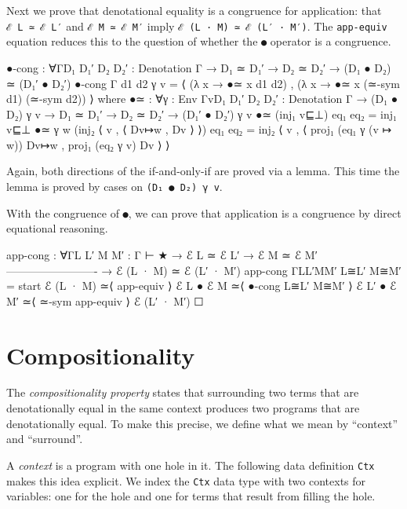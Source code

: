 Next we prove that denotational equality is a congruence for
application: that \texttt{ℰ\ L\ ≃\ ℰ\ L′} and \texttt{ℰ\ M\ ≃\ ℰ\ M′}
imply \texttt{ℰ\ (L\ ·\ M)\ ≃\ ℰ\ (L′\ ·\ M′)}. The \texttt{app-equiv}
equation reduces this to the question of whether the \texttt{●} operator
is a congruence.

\begin{fence}
\begin{code}
●-cong : ∀{Γ}{D₁ D₁′ D₂ D₂′ : Denotation Γ}
  → D₁ ≃ D₁′ → D₂ ≃ D₂′
  → (D₁ ● D₂) ≃ (D₁′ ● D₂′)
●-cong {Γ} d1 d2 γ v = ⟨ (λ x → ●≃ x d1 d2) ,
                         (λ x → ●≃ x (≃-sym d1) (≃-sym d2)) ⟩
  where
  ●≃ : ∀{γ : Env Γ}{v}{D₁ D₁′ D₂ D₂′ : Denotation Γ}
    → (D₁ ● D₂) γ v  →  D₁ ≃ D₁′  →  D₂ ≃ D₂′
    → (D₁′ ● D₂′) γ v
  ●≃ (inj₁ v⊑⊥) eq₁ eq₂ = inj₁ v⊑⊥
  ●≃ {γ} {w} (inj₂ ⟨ v , ⟨ Dv↦w , Dv ⟩ ⟩) eq₁ eq₂ =
    inj₂ ⟨ v , ⟨ proj₁ (eq₁ γ (v ↦ w)) Dv↦w , proj₁ (eq₂ γ v) Dv ⟩ ⟩
\end{code}
\end{fence}

Again, both directions of the if-and-only-if are proved via a lemma.
This time the lemma is proved by cases on \texttt{(D₁\ ●\ D₂)\ γ\ v}.

With the congruence of \texttt{●}, we can prove that application is a
congruence by direct equational reasoning.

\begin{fence}
\begin{code}
app-cong : ∀{Γ}{L L′ M M′ : Γ ⊢ ★}
  → ℰ L ≃ ℰ L′
  → ℰ M ≃ ℰ M′
    -------------------------
  → ℰ (L · M) ≃ ℰ (L′ · M′)
app-cong {Γ}{L}{L′}{M}{M′} L≅L′ M≅M′ =
  start
    ℰ (L · M)
  ≃⟨ app-equiv ⟩
    ℰ L ● ℰ M
  ≃⟨ ●-cong L≅L′ M≅M′ ⟩
    ℰ L′ ● ℰ M′
  ≃⟨ ≃-sym app-equiv ⟩
    ℰ (L′ · M′)
  ☐
\end{code}
\end{fence}

\hypertarget{compositionality}{%
\section{Compositionality}\label{compositionality}}

The \emph{compositionality property} states that surrounding two terms
that are denotationally equal in the same context produces two programs
that are denotationally equal. To make this precise, we define what we
mean by ``context'' and ``surround''.

A \emph{context} is a program with one hole in it. The following data
definition \texttt{Ctx} makes this idea explicit. We index the
\texttt{Ctx} data type with two contexts for variables: one for the hole
and one for terms that result from filling the hole.

